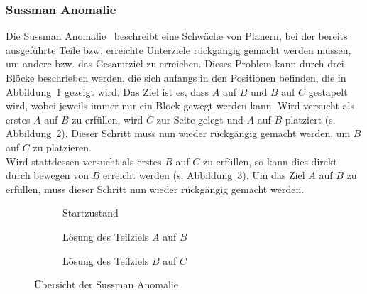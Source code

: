 \subsubsection{Sussman Anomalie}
Die Sussman Anomalie~\cite{sussman} beschreibt eine Schwäche von Planern, bei der bereits ausgeführte Teile bzw. erreichte Unterziele rückgängig gemacht werden müssen, um andere bzw. das Gesamtziel zu erreichen.
Dieses Problem kann durch drei Blöcke beschrieben werden, die sich anfangs in den Positionen befinden, die in Abbildung~\ref{fig:sussstart} gezeigt wird.
Das Ziel ist es, dass $A$ auf $B$ und $B$ auf $C$ gestapelt wird, wobei jeweils immer nur ein Block gewegt werden kann.
Wird versucht als erstes $A$ auf $B$ zu erfüllen, wird $C$ zur Seite gelegt und $A$ auf $B$ platziert (s. Abbildung~\ref{fig:sussmanab}).
Dieser Schritt muss nun wieder rückgängig gemacht werden, um $B$ auf $C$ zu platzieren.\\
Wird stattdessen versucht als erstes $B$ auf $C$ zu erfüllen, so kann dies direkt durch bewegen von $B$ erreicht werden (s. Abbildung~\ref{fig:sussmanbc}).
Um das Ziel $A$ auf $B$ zu erfüllen, muss dieser Schritt nun wieder rückgängig gemacht werden.
\begin{figure}
    \begin{subfigure}[t]{0.3\textwidth}
        \centering
        \caption{Startzustand}
        \label{fig:sussstart}
    \end{subfigure}
    \hfill
    \begin{subfigure}[t]{0.3\textwidth}
        \centering
        \caption{Lösung des Teilziels $A$ auf $B$}
        \label{fig:sussmanab}
    \end{subfigure}
    \hfill
    \begin{subfigure}[t]{0.3\textwidth}
        \centering
        \caption{Lösung des Teilziels $B$ auf $C$}
        \label{fig:sussmanbc}
    \end{subfigure}
    \caption{Übersicht der Sussman Anomalie}
    \label{fig:sussman}
\end{figure}
